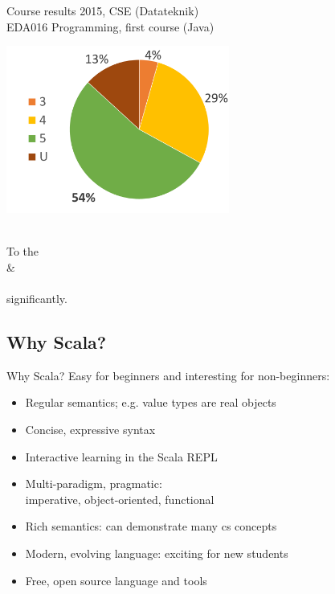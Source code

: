 \documentclass{lecturenotes}
\begin{document}
\begin{Slide}{Course results 2015, CSE (Datateknik)\\EDA016 Programming, first course (Java)}
\begin{multicols}{2}

  \vspace{1em}

\includegraphics[width=0.55\textwidth]{img/grades-2015}

\columnbreak

\raggedleft {} \\
To  the \\  \& \\   \\ significantly.
\end{multicols}
\end{Slide}



\subsection{Why Scala?}

\begin{Slide}{Why Scala?}
Easy for beginners and interesting for non-beginners:
\begin{itemize}
\item Regular semantics; e.g. value types are real objects
\item Concise, expressive syntax
\item Interactive learning in the Scala REPL
\item Multi-paradigm, pragmatic: \\ imperative, object-oriented, functional
\item Rich semantics: can demonstrate many cs concepts
\item Modern, evolving language: exciting for new students
\item Free, open source language and tools
\end{itemize}
\end{Slide}
\end{document}

